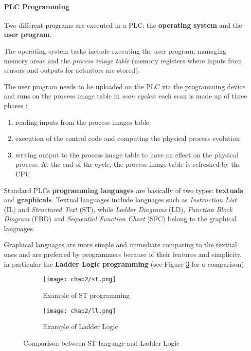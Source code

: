 \paragraph{PLC Programming}
\label{subsubsec:2_plc_programming}
Two different programs are executed in a PLC: the \textbf{operating system} and the \textbf{user program}.

\bigskip
The operating system tasks include executing the user program, managing memory areas and the \textit{process image table} (memory registers where inputs from sensors and outputs for actuators are stored).

\bigskip
The user program needs to be uploaded on the PLC via the programming device and runs on the process image table in \textit{scan cycles}: each scan is made up of three phases \cite{ceccato}:

\begin{enumerate}
	\item reading inputs from the process images table
	\item execution of the control code and computing the physical process evolution
	\item writing output to the process image table to have an effect on the physical process. At the end of the cycle, the process image table is refreshed by the CPU
\end{enumerate}

Standard PLCs \textbf{programming languages} are basically of two types: \textbf{textuals} and \textbf{graphicals}.
Textual languages include languages such as \textit{Instruction List} (IL) and \textit{Structured Text} (ST), while \textit{Ladder Diagrams} (LD), \textit{Function Block Diagram} (FBD) and \textit{Sequential Function Chart} (SFC) belong to the graphical languages.

\bigskip
Graphical languages are more simple and immediate comparing to the textual ones and are preferred by programmers because of their features and simplicity, in particular the \textbf{Ladder Logic programming} (see Figure \ref{fig:st_ll_comparison} for a comparison).

\begin{figure}[ht]
	\centering
	\begin{subfigure}{0.47\textwidth}
		\texttt{[image: chap2/st.png]}
		\caption{Example of ST programming}
		\label{subfig:st_example}
	\end{subfigure}
	\hfill
	\begin{subfigure}{0.47\textwidth}
		\texttt{[image: chap2/ll.png]}
		\caption{Example of Ladder Logic}
		\label{subfig:ladder_logic_example}
	\end{subfigure}
	\caption{Comparison between ST language and Ladder Logic}
	\label{fig:st_ll_comparison}
	
\end{figure}

